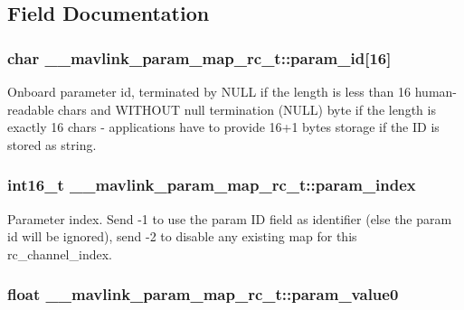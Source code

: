 \subsection{Field Documentation}
\hypertarget{struct____mavlink__param__map__rc__t_a888335c93bc959e5111880b17eb85664}{
\subsubsection[{param\+\_\+id}]{\setlength{\rightskip}{0pt plus 5cm}char \+\_\+\+\_\+mavlink\+\_\+param\+\_\+map\+\_\+rc\+\_\+t\+::param\+\_\+id\mbox{[}16\mbox{]}}}\label{struct____mavlink__param__map__rc__t_a888335c93bc959e5111880b17eb85664}


Onboard parameter id, terminated by N\+U\+L\+L if the length is less than 16 human-\/readable chars and W\+I\+T\+H\+O\+U\+T null termination (N\+U\+L\+L) byte if the length is exactly 16 chars -\/ applications have to provide 16+1 bytes storage if the I\+D is stored as string. 

\hypertarget{struct____mavlink__param__map__rc__t_a845203e49f83bc765bcb8dcd54ae4fdd}{
\subsubsection[{param\+\_\+index}]{\setlength{\rightskip}{0pt plus 5cm}int16\+\_\+t \+\_\+\+\_\+mavlink\+\_\+param\+\_\+map\+\_\+rc\+\_\+t\+::param\+\_\+index}}\label{struct____mavlink__param__map__rc__t_a845203e49f83bc765bcb8dcd54ae4fdd}


Parameter index. Send -\/1 to use the param I\+D field as identifier (else the param id will be ignored), send -\/2 to disable any existing map for this rc\+\_\+channel\+\_\+index. 

\hypertarget{struct____mavlink__param__map__rc__t_a31fafab661ce9e57eec4108220e584a3}{
\subsubsection[{param\+\_\+value0}]{\setlength{\rightskip}{0pt plus 5cm}float \+\_\+\+\_\+mavlink\+\_\+param\+\_\+map\+\_\+rc\+\_\+t\+::param\+\_\+value0}}\label{struct____mavlink__param__map__rc__t_a31fafab661ce9e57eec4108220e584a3}


